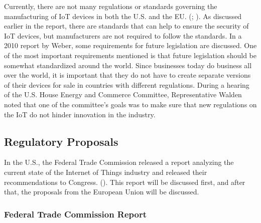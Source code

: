 \documentclass[letterpaper, 12pt]{article}
\begin{document}
\begin{flushleft}
Currently, there are not many regulations or standards governing the manufacturing of IoT devices in both the U.S. and the EU. (\cite{Weber201023}; \cite{housecyberattacks}).  As discussed earlier in the report, there are standards that can help to ensure the security of IoT devices, but manufacturers are
not required to follow the standards. In a 2010 report by Weber, some requirements for future legislation are discussed. One of the most important 
requirements mentioned is that future legislation should be somewhat standardized around the world. Since businesses today do business all over the world,
it is important that they do not have to create separate versions of their devices for sale in countries with different regulations. During a hearing of the
U.S. House Energy and Commerce Committee, Representative Walden noted that one of the committee's goals was to make sure that new regulations on the IoT do not hinder innovation in the industry. 

\subsection*{Regulatory Proposals}

In the U.S., the Federal Trade Commission released a report analyzing the current state of the Internet of Things industry and released their recommendations
to Congress. (\cite{ftc}). This report will be discussed first, and after that, the proposals from the European Union will be discussed.

\subsubsection*{Federal Trade Commission Report}


\end{flushleft}
\end{document}
